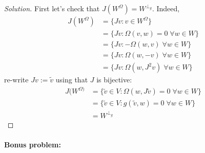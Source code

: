 \begin{proof}[Solution]\leavevmode
	First let's check that $J(W^{\Omega} )=W^{\perp_{g}}$. Indeed,
	\begin{align*}
		J(W^{\Omega} )&= \{Jv:v\in W^{\Omega}\}\\
&=\{Jv:\Omega(v,w)=0\;\forall w\in W\} \\
&=\{Jv:-\Omega(w,v)\;\forall w\in W\} \\
& =\{Jv:\Omega(w,-v)\;\forall w\in W\} \\
&=\{Jv:\Omega(w,J^{2}v)\;\forall w\in W\}
	\end{align*}
re-write $Jv:=\tilde{v}$ using that $J$ is bijective:
	\begin{align*}
J(W^{\Omega)}&=\{\tilde{v}\in V:\Omega(w,J\tilde{v})=0\;\forall w\in W\} \\
&=\{ \tilde{v}\in V:g(\tilde{v},w)=0\;\forall w\in W\} \\
& =W^{\perp_{g}}
	\end{align*}


\end{proof}

\paragraph{Bonus problem: } 


